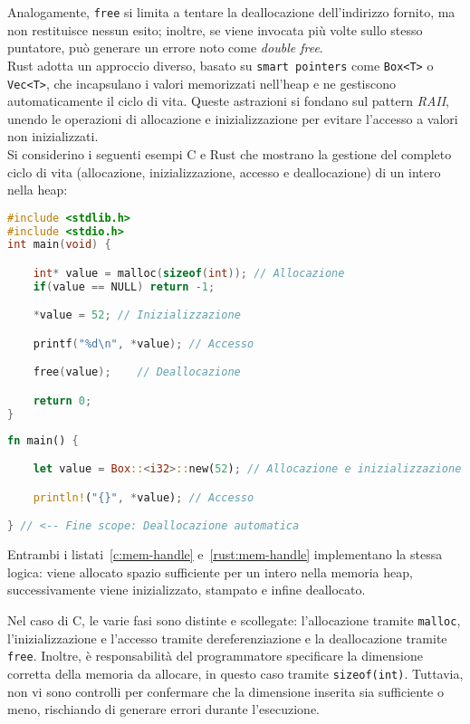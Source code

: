 Analogamente, \texttt{free} si limita a tentare la deallocazione dell'indirizzo fornito, ma non restituisce nessun esito; inoltre, se viene invocata più volte sullo stesso puntatore, può generare un errore noto come \textit{double free}. \hfill
\vspace{0pt}\\
\noindent Rust adotta un approccio diverso, basato su \texttt{smart pointers} come \texttt{Box<T>} o \texttt{Vec<T>}, che incapsulano i valori memorizzati nell'heap e ne gestiscono automaticamente il ciclo di vita.
Queste astrazioni si fondano sul pattern \textit{RAII}, unendo le operazioni di allocazione e inizializzazione per evitare l'accesso a valori non inizializzati. \hfill
\vspace{10pt}\\
\noindent Si considerino i seguenti esempi C e Rust che mostrano la gestione del completo ciclo di vita (allocazione, inizializzazione, accesso e deallocazione) di un intero nella heap:
\begin{lstlisting}[language=C, caption={Gestione ciclo di vita in memoria dinamica C}, label={c:mem-handle}]
#include <stdlib.h>
#include <stdio.h>
int main(void) {

    int* value = malloc(sizeof(int)); // Allocazione
    if(value == NULL) return -1;

    *value = 52; // Inizializzazione

    printf("%d\n", *value); // Accesso

    free(value);    // Deallocazione

    return 0;
}

\end{lstlisting}
\begin{lstlisting}[language=Rust, caption={Gestione ciclo di vita in memoria dinamica Rust}, label={rust:mem-handle}]
fn main() {

    let value = Box::<i32>::new(52); // Allocazione e inizializzazione

    println!("{}", *value); // Accesso

} // <-- Fine scope: Deallocazione automatica
\end{lstlisting}
Entrambi i listati~\ref{c:mem-handle} e~\ref{rust:mem-handle} implementano la stessa logica: viene allocato spazio sufficiente per un intero
nella memoria heap, successivamente viene inizializzato, stampato e infine deallocato.

Nel caso di C, le varie fasi sono distinte e scollegate: l'allocazione tramite \texttt{malloc}, l'inizializzazione e l'accesso tramite dereferenziazione e la deallocazione tramite \texttt{free}.
Inoltre, è responsabilità del programmatore specificare la dimensione corretta della memoria da allocare, in questo caso tramite \texttt{sizeof(int)}. Tuttavia, non vi sono controlli per confermare
che la dimensione inserita sia sufficiente o meno, rischiando di generare errori durante l'esecuzione.

